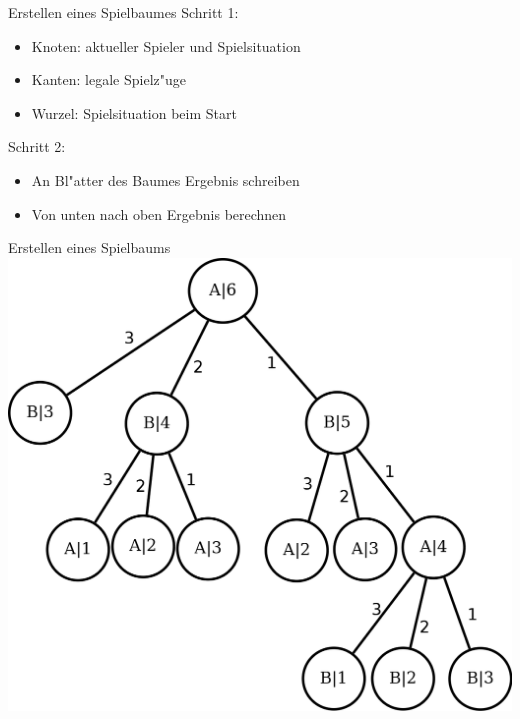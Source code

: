 \documentclass[18pt]{beamer}
\begin{document}
\begin{frame}{Erstellen eines Spielbaumes}
Schritt 1:
\begin{itemize}
\item Knoten: aktueller Spieler und Spielsituation
\item Kanten: legale Spielz"uge
\item Wurzel: Spielsituation beim Start
\end{itemize}
\pause
Schritt 2:
\begin{itemize}
\item An Bl"atter des Baumes Ergebnis schreiben
\item Von unten nach oben Ergebnis berechnen
\end{itemize}
\end{frame}

\begin{frame}{Erstellen eines Spielbaums}
\includegraphics[scale=0.4]{baum0.png}
\end{frame}
\end{document}
